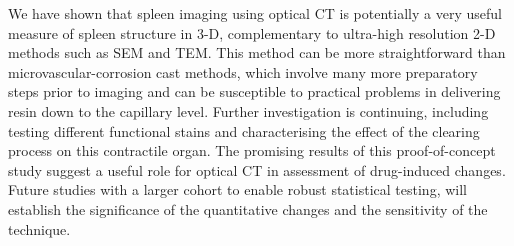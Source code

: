 	We have shown that spleen imaging using optical CT is potentially a very useful measure of spleen structure in 3-D, complementary to ultra-high resolution 2-D methods such as SEM and TEM. This method can be more straightforward than microvascular-corrosion cast methods, which involve many more preparatory steps prior to imaging and can be susceptible to practical problems in delivering resin down to the capillary level. Further investigation is continuing, including testing different functional stains and characterising the effect of the clearing process on this contractile organ. The promising results of this proof-of-concept study suggest a useful role for optical CT in assessment of drug-induced changes. Future studies with a larger cohort to enable robust statistical testing, will establish the significance of the quantitative changes and the sensitivity of the technique. 
	
